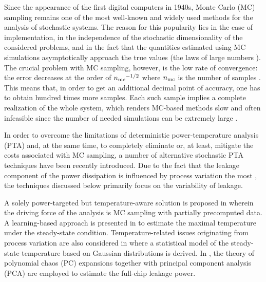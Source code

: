 Since the appearance of the first digital computers in 1940s, Monte Carlo (MC) sampling remains one of the most well-known and widely used methods for the analysis of stochastic systems.
The reason for this popularity lies in the ease of implementation, in the independence of the stochastic dimensionality of the considered problems, and in the fact that the quantities estimated using MC simulations asymptotically approach the true values (the laws of large numbers \cite{durrett2010}).
The crucial problem with MC sampling, however, is the low rate of convergence: the error decreases at the order of ${n_\text{mc}}^{-1/2}$ where ${n_\text{mc}}$ is the number of samples \cite{xiu2010, maitre2010}.
This means that, in order to get an additional decimal point of accuracy, one has to obtain hundred times more samples.
Each such sample implies a complete realization of the whole system, which renders MC-based methods slow and often infeasible since the number of needed simulations can be extremely large \cite{diaz-emparanza2002}.

In order to overcome the limitations of deterministic power-temperature analysis (PTA) and, at the same time, to completely eliminate or, at least, mitigate the costs associated with MC sampling, a number of alternative stochastic PTA techniques have been recently introduced.
Due to the fact that the leakage component of the power dissipation is influenced by process variation the most \cite{chandrakasan2001, srivastava2010, juan2011, juan2012}, the techniques discussed below primarily focus on the variability of leakage.

A solely power-targeted but temperature-aware solution is proposed in \cite{chandra2010} wherein the driving force of the analysis is MC sampling with partially precomputed data.
A learning-based approach is presented in \cite{juan2011} to estimate the maximal temperature under the steady-state condition.
Temperature-related issues originating from process variation are also considered in \cite{juan2012} where a statistical model of the steady-state temperature based on Gaussian distributions is derived.
In \cite{shen2009}, the theory of polynomial chaos (PC) expansions \cite{xiu2010, maitre2010, ghanem1991, eldred2008} together with principal component analysis (PCA) are employed to estimate the full-chip leakage power.


